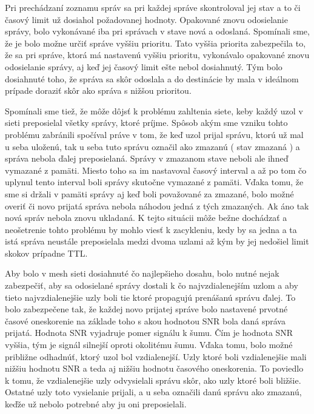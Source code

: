 \documentclass[slovak,master]{diploma}
\begin{document}
Pri prechádzaní zoznamu správ sa pri každej správe skontroloval jej stav a to či časový limit už dosiahol požadovanej hodnoty. Opakované znovu odosielanie 
správy, bolo vykonávané iba pri správach v stave nová a odoslaná. Spomínali sme, že je bolo možne určiť správe vyššiu prioritu. Tato vyššia priorita zabezpečila to, že sa pri správe, 
ktorá má nastavenú vyššiu prioritu, vykonávalo opakované znovu odosielanie správy, aj keď jej časový limit ešte nebol dosiahnutý. Tým bolo dosiahnuté toho, že správa sa 
skôr odoslala a do destinácie by mala v ideálnom prípade doraziť skôr ako správa s nižšou prioritou.

Spomínali sme tiež, že môže dôjsť k problému zahltenia siete, keby každý uzol v sieti preposielal všetky správy, ktoré príjme. Spôsob akým sme vzniku tohto problému zabránili 
spočíval práve v tom, že keď uzol prijal správu, ktorú už mal u seba uloženú, tak u seba tuto správu označil ako zmazanú ( stav zmazaná ) a správa nebola ďalej preposielaná. 
Správy v zmazanom stave neboli ale ihneď vymazané z pamäti. Miesto toho sa im nastavoval časový interval a až po tom čo uplynul tento interval boli správy skutočne vymazané z pamäti. 
Vďaka tomu, že sme si držali v pamäti správy aj keď boli považované za zmazané, bolo možné overiť či novo prijatá správa nebola náhodou jedná z tých zmazaných. Ak áno tak nová 
správ nebola znovu ukladaná. K tejto situácii môže bežne dochádzať a neošetrenie tohto problému by mohlo viesť k zacykleniu, kedy by sa jedna a ta istá správa neustále 
preposielala medzi dvoma uzlami až kým by jej nedošiel limit skokov prípadne TTL.

Aby bolo v mesh sieti dosiahnuté čo najlepšieho dosahu, bolo nutné nejak zabezpečiť, aby sa odosielané správy dostali k čo najvzdialenejším uzlom a aby tieto 
najvzdialenejšie uzly boli tie ktoré propagujú prenášanú správu ďalej. To bolo zabezpečene tak, že každej novo prijatej správe bolo nastavené prvotné časové oneskorenie na základe 
toho s akou hodnotou SNR bola daná správa prijatá. Hodnota SNR vyjadruje pomer signálu k šumu. Čím je hodnota SNR vyššia, tým je signál silnejší oproti okolitému šumu.
Vďaka tomu, bolo možné približne odhadnúť, ktorý uzol bol vzdialenejší. Uzly ktoré boli vzdialenejšie mali nižšiu hodnotu SNR a teda aj nižšiu hodnotu časového oneskorenia.
To poviedlo k tomu, že vzdialenejšie uzly odvysielali správu skôr, ako uzly ktoré boli bližšie. Ostatné uzly toto vysielanie prijali, a u seba označili danú správu ako zmazanú, 
keďže už nebolo potrebné aby ju oni preposielali.
\end{document}
